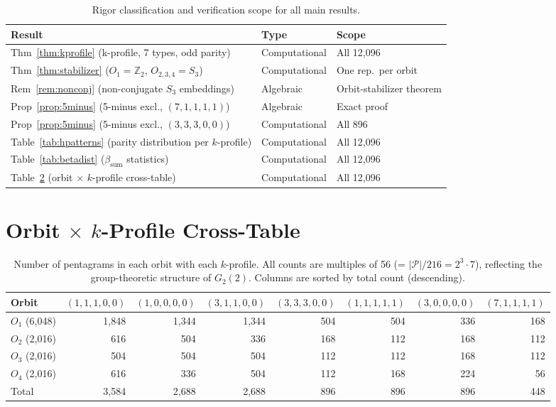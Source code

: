 \documentclass[11pt,a4paper]{article}
\theoremstyle{remark}
\begin{document}
\begin{table}[H]
\centering
\caption{Rigor classification and verification scope for all main results.}
\label{tab:rigor}
\begin{tabular}{p{6cm}ll}
\toprule
Result & Type & Scope \\
\midrule
Thm~\ref{thm:kprofile} (k-profile, 7 types, odd parity)
  & Computational & All 12{,}096 \cite{PaperXIVsuppl} \\
Thm~\ref{thm:stabilizer} ($O_1 = \mathbb{Z}_2$, $O_{2,3,4} = S_3$)
  & Computational & One rep.\ per orbit \\
Rem~\ref{rem:nonconj} (non-conjugate $S_3$ embeddings)
  & Algebraic & Orbit-stabilizer theorem \\
Prop~\ref{prop:5minus} (5-minus excl., $(7,1,1,1,1)$)
  & Algebraic & Exact proof \\
Prop~\ref{prop:5minus} (5-minus excl., $(3,3,3,0,0)$)
  & Computational & All 896 \cite{PaperXIVsuppl} \\
Table~\ref{tab:hpatterns} (parity distribution per $k$-profile)
  & Computational & All 12{,}096 \cite{PaperXIVsuppl} \\
Table~\ref{tab:betadist} ($\beta_{\mathrm{sum}}$ statistics)
  & Computational & All 12{,}096 \cite{PaperXIVsuppl} \\
Table~\ref{tab:crosstable} (orbit $\times$ $k$-profile cross-table)
  & Computational & All 12{,}096 \cite{PaperXIVsuppl} \\
\bottomrule
\end{tabular}
\end{table}

\section{Orbit $\times$ $k$-Profile Cross-Table}

\begin{table}[H]
\centering
\caption{Number of pentagrams in each orbit with each $k$-profile.
All counts are multiples of 56 (= $|\mathcal{P}|/216 = 2^3 \cdot 7$),
reflecting the group-theoretic structure of $G_2(2)$.
Columns are sorted by total count (descending).}
\label{tab:crosstable}
\setlength{\tabcolsep}{4pt}
\begin{tabular}{lrrrrrrr}
\toprule
Orbit & $(1,1,1,0,0)$ & $(1,0,0,0,0)$ & $(3,1,1,0,0)$ & $(3,3,3,0,0)$
      & $(1,1,1,1,1)$ & $(3,0,0,0,0)$ & $(7,1,1,1,1)$ \\
\midrule
$O_1$ (6{,}048) & 1{,}848 & 1{,}344 & 1{,}344 & 504 & 504 & 336 & 168 \\
$O_2$ (2{,}016) &   616 &   504 &   336 & 168 & 112 & 168 & 112 \\
$O_3$ (2{,}016) &   504 &   504 &   504 & 112 & 112 & 168 & 112 \\
$O_4$ (2{,}016) &   616 &   336 &   504 & 112 & 168 & 224 &  56 \\
\midrule
Total & 3{,}584 & 2{,}688 & 2{,}688 & 896 & 896 & 896 & 448 \\
\bottomrule
\end{tabular}
\end{table}
\end{document}
